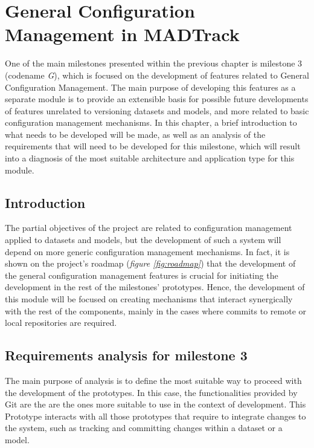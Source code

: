 \chapter{General Configuration Management in MADTrack}\label{cap:Milestone3}

One of the main milestones presented within the previous chapter is milestone 3 (codename \emph{G}), which is focused on the development of features related to General
Configuration Management. The main purpose of developing this features as a separate module is to provide an extensible basis for possible future developments of features
unrelated to versioning datasets and models, and more related to basic configuration management mechanisms. In this chapter, a brief introduction to what needs to be developed
will be made, as well as an analysis of the requirements that will need to be developed for this milestone, which will result into a diagnosis of the most suitable architecture
and application type for this module.

\section{Introduction}

The partial objectives of the project are related to configuration management applied to datasets and models, but the development of such a system will depend on more generic
configuration management mechanisms. In fact, it is shown on the project's roadmap (\emph{figure \ref{fig:roadmap}}) that the development of the general configuration management
features is crucial for initiating the development in the rest of the milestones' prototypes. Hence, the development of this module will be focused on creating mechanisms that interact
synergically with the rest of the components, mainly in the cases where commits to remote or local repositories are required.

\section{Requirements analysis for milestone 3}

The main purpose of analysis is to define the most suitable way to proceed with the development of the prototypes. In this case, the functionalities provided by Git are the 
are the ones more suitable to use in the context of development. This Prototype interacts with all those prototypes that require to integrate changes to the system, such as 
tracking and committing changes within a dataset or a model.

